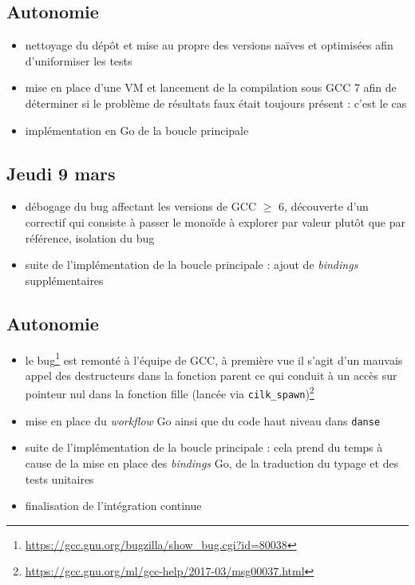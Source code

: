 \documentclass[12pt,a4paper]{report}
\let\geq\geqslant
\begin{document}
\subsection*{Autonomie}
\begin{itemize}
	\item	nettoyage du dépôt et mise au propre des versions naïves et optimisées afin d'uniformiser les tests
	\item	mise en place d'une VM et lancement de la compilation sous GCC 7 afin de déterminer si le problème de résultats faux était toujours présent : c'est le cas
	\item	implémentation en Go de la boucle principale
\end{itemize}

\subsection*{Jeudi 9 mars}
\begin{itemize}
	\item	débogage du bug affectant les versions de GCC $\geq$ 6, découverte d'un correctif qui consiste à passer le monoïde à explorer par valeur plutôt que par référence, isolation du bug
	\item	suite de l'implémentation de la boucle principale : ajout de \emph{bindings} supplémentaires
\end{itemize}

\subsection*{Autonomie}
\begin{itemize}
	\item	le bug\footnote{\url{https://gcc.gnu.org/bugzilla/show_bug.cgi?id=80038}} est remonté à l'équipe de GCC, à première vue il s'agit d'un mauvais appel des destructeurs dans la fonction parent ce qui conduit à un accès sur pointeur nul dans la fonction fille (lancée via \texttt{cilk\_spawn})\footnote{\url{https://gcc.gnu.org/ml/gcc-help/2017-03/msg00037.html}}
	\item	mise en place du \emph{workflow} Go ainsi que du code haut niveau dans \texttt{danse}
	\item	suite de l'implémentation de la boucle principale : cela prend du temps à cause de la mise en place des \emph{bindings} Go, de la traduction du typage et des tests unitaires
	\item	finalisation de l'intégration continue
\end{itemize}
\end{document}
